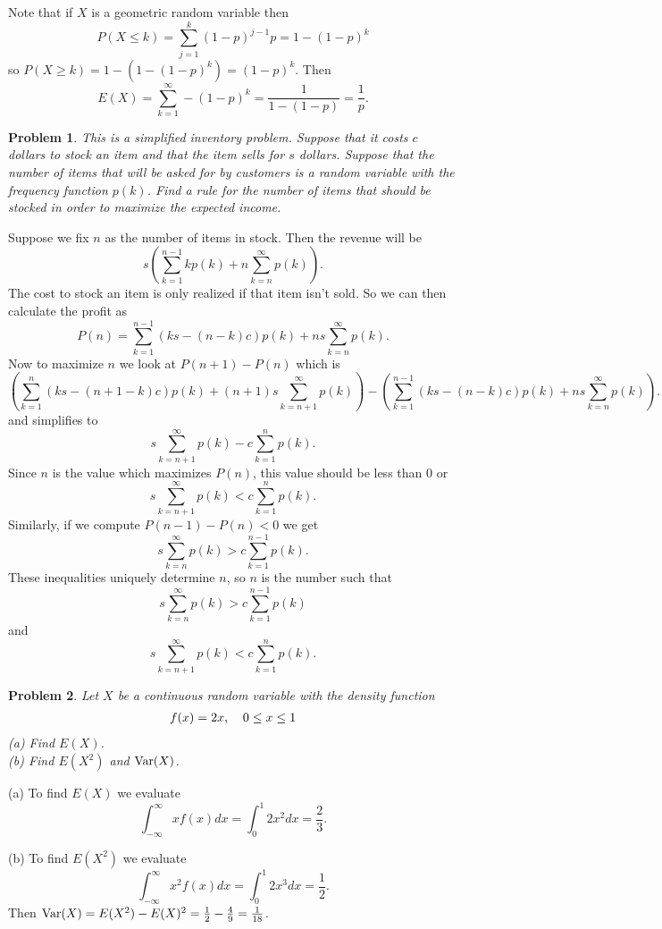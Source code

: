 \documentclass{article}
\newtheorem{problem}{Problem}
\newcommand{\var}{\textup{Var}}
\begin{document}
Note that if $X$ is a geometric random variable then
\[
P(X \leq k) = \sum_{j=1}^k (1-p)^{j-1} p = 1 - (1 - p)^k
\]
so $P(X \geq k) = 1 - (1 - (1-p)^k) = (1-p)^k$. Then
\[
E(X) = \sum_{k=1}^{\infty} - (1-p)^k = \frac{1}{1 - (1-p)} = \frac{1}{p}.
\]

\begin{problem}
This is a simplified inventory problem. Suppose that it costs $c$ dollars to stock an item and that the item sells for $s$ dollars. Suppose that the number of items that will be asked for by customers is a random variable with the frequency function $p(k)$. Find a rule for the number of items that should be stocked in order to maximize the expected income.
\end{problem}

Suppose we fix $n$ as the number of items in stock. Then the revenue will be
\[
s \left ( \sum_{k=1}^{n-1} k p(k) + n \sum_{k=n}^{\infty} p(k) \right ).
\]
The cost to stock an item is only realized if that item isn't sold. So we can then calculate the profit as
\[
P(n) = \sum_{k=1}^{n-1} (k s - (n-k) c)p(k) + n s \sum_{k=n}^{\infty} p(k).
\]
Now to maximize $n$ we look at $P(n+1) - P(n)$ which is
\[
\left ( \sum_{k=1}^{n} (k s - (n+1-k) c)p(k) + (n+1) s \sum_{k=n+1}^{\infty} p(k) \right ) - \left ( \sum_{k=1}^{n-1} (k s - (n-k) c)p(k) + n s \sum_{k=n}^{\infty} p(k) \right ).
\]
and simplifies to
\[
s\sum_{k=n+1}^{\infty} p(k) - c \sum_{k=1}^n p(k).
\]
Since $n$ is the value which maximizes $P(n)$, this value should be less than $0$ or
\[
s \sum_{k=n+1}^{\infty} p(k) < c \sum_{k=1}^n p(k).
\]
Similarly, if we compute $P(n-1) - P(n) < 0$ we get
\[
s \sum_{k=n}^{\infty} p(k) > c \sum_{k=1}^{n-1} p(k).
\]
These inequalities uniquely determine $n$, so $n$ is the number such that
\[
s \sum_{k=n}^{\infty} p(k) > c \sum_{k=1}^{n-1} p(k)
\]
and
\[
s \sum_{k=n+1}^{\infty} p(k) < c \sum_{k=1}^n p(k).
\]

\begin{problem}
Let $X$ be a continuous random variable with the density function
\[
\begin{tabular}{cc}
$f(x) = 2x$, & $0 \leq x \leq 1$
\end{tabular}
\]
(a) Find $E(X)$.\\
(b) Find $E(X^2)$ and $\var(X)$.
\end{problem}

(a) To find $E(X)$ we evaluate
\[
\int_{-\infty}^{\infty} xf(x) dx = \int_0^1 2x^2 dx = \frac{2}{3}.
\]

(b) To find $E(X^2)$ we evaluate
\[
\int_{-\infty}^{\infty} x^2 f(x) dx = \int_0^1 2x^3 dx = \frac{1}{2}.
\]
Then $\var(X) = E(X^2) - E(X)^2 = \frac{1}{2} - \frac{4}{9} = \frac{1}{18}$.
\end{document}
